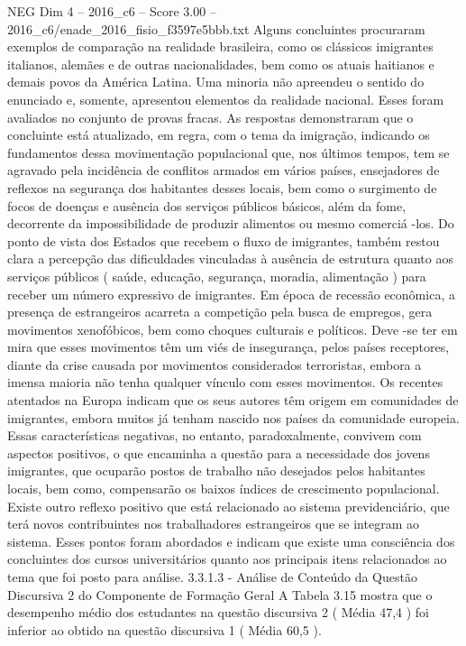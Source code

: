 \begin{textsample}{NEG Dim 4 – 2016\_c6 – Score 3.00 – 2016\_c6/enade\_2016\_fisio\_f3597e5bbb.txt}
Alguns concluintes procuraram exemplos de comparação na realidade brasileira, como os clássicos imigrantes italianos, alemães e de outras nacionalidades, bem como os atuais haitianos e demais povos da América Latina.
Uma minoria não apreendeu o sentido do enunciado e, somente, apresentou elementos da realidade nacional.
Esses foram avaliados no conjunto de provas fracas.
As respostas demonstraram que o concluinte está atualizado, em regra, com o tema da imigração, indicando os fundamentos dessa movimentação populacional que, nos últimos tempos, tem se agravado pela incidência de conflitos armados em vários países, ensejadores de reflexos na segurança dos habitantes desses locais, bem como o surgimento de focos de doenças e ausência dos serviços públicos básicos, além da fome, decorrente da impossibilidade de produzir alimentos ou mesmo comerciá -los.
Do ponto de vista dos Estados que recebem o fluxo de imigrantes, também restou clara a percepção das dificuldades vinculadas à ausência de estrutura quanto aos serviços públicos ( saúde, educação, segurança, moradia, alimentação ) para receber um número expressivo de imigrantes.
Em época de recessão econômica, a presença de estrangeiros acarreta a competição pela busca de empregos, gera movimentos xenofóbicos, bem como choques culturais e políticos.
Deve -se ter em mira que esses movimentos têm um viés de insegurança, pelos países receptores, diante da crise causada por movimentos considerados terroristas, embora a imensa maioria não tenha qualquer vínculo com esses movimentos.
Os recentes atentados na Europa indicam que os seus autores têm origem em comunidades de imigrantes, embora muitos já tenham nascido nos países da comunidade europeia.
Essas características negativas, no entanto, paradoxalmente, convivem com aspectos positivos, o que encaminha a questão para a necessidade dos jovens imigrantes, que ocuparão postos de trabalho não desejados pelos habitantes locais, bem como, compensarão os baixos índices de crescimento populacional.
Existe outro reflexo positivo que está relacionado ao sistema previdenciário, que terá novos contribuintes nos trabalhadores estrangeiros que se integram ao sistema.
Esses pontos foram abordados e indicam que existe uma consciência dos concluintes dos cursos universitários quanto aos principais itens relacionados ao tema que foi posto para análise. 3.3.1.3 - Análise de Conteúdo da Questão Discursiva 2 do Componente de Formação Geral A Tabela 3.15 mostra que o desempenho médio dos estudantes na questão discursiva 2 ( Média 47,4 ) foi inferior ao obtido na questão discursiva 1 ( Média 60,5 ).

\end{textsample}
